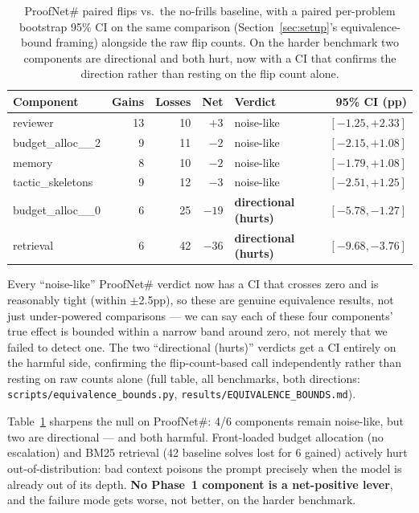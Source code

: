 \documentclass{article}
\begin{document}
\begin{table}[t]
  \centering
  \caption{ProofNet\# paired flips vs.\ the no-frills baseline, with a paired per-problem bootstrap
  95\% CI on the same comparison (Section~\ref{sec:setup}'s equivalence-bound framing) alongside the
  raw flip counts. On the harder benchmark two components are directional and both hurt, now with a
  CI that confirms the direction rather than resting on the flip count alone.}
  \label{tab:flips}
  \begin{tabular}{lrrrlr}
    \toprule
    Component & Gains & Losses & Net & Verdict & 95\% CI (pp) \\
    \midrule
    reviewer            & 13 & 10 & $+3$  & noise-like & $[-1.25, +2.33]$ \\
    budget\_alloc\_\_2   &  9 & 11 & $-2$  & noise-like & $[-2.15, +1.08]$ \\
    memory               &  8 & 10 & $-2$  & noise-like & $[-1.79, +1.08]$ \\
    tactic\_skeletons    &  9 & 12 & $-3$  & noise-like & $[-2.51, +1.25]$ \\
    budget\_alloc\_\_0   &  6 & 25 & $-19$ & \textbf{directional (hurts)} & $\mathbf{[-5.78, -1.27]}$ \\
    retrieval             &  6 & 42 & $-36$ & \textbf{directional (hurts)} & $\mathbf{[-9.68, -3.76]}$ \\
    \bottomrule
  \end{tabular}
\end{table}

Every ``noise-like'' ProofNet\# verdict now has a CI that crosses zero and is reasonably tight
(within $\pm$2.5pp), so these are genuine equivalence results, not just under-powered comparisons ---
we can say each of these four components' true effect is bounded within a narrow band around zero,
not merely that we failed to detect one. The two ``directional (hurts)'' verdicts get a CI entirely
on the harmful side, confirming the flip-count-based call independently rather than resting on raw
counts alone (full table, all benchmarks, both directions:
\texttt{scripts/equivalence\_bounds.py}, \texttt{results/EQUIVALENCE\_BOUNDS.md}).

Table~\ref{tab:flips} sharpens the null on ProofNet\#: 4/6 components remain noise-like, but two are
directional --- and both harmful. Front-loaded budget allocation (no escalation) and BM25 retrieval (42
baseline solves lost for 6 gained) actively hurt out-of-distribution: bad context poisons the prompt
precisely when the model is already out of its depth. \textbf{No Phase~1 component is a net-positive
lever}, and the failure mode gets worse, not better, on the harder benchmark.
\end{document}

